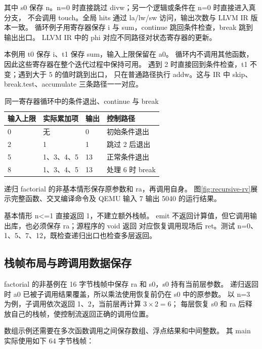其中 s0 保存 n。n=0 时直接跳过 divw；另一个逻辑或条件在 n=0 时直接进入真分支，
不会调用 touch。全局 hits 通过 la/lw/sw 访问，输出次数与 LLVM IR 版本一致。
循环例子用寄存器保存 i 与 sum，continue 跳回条件检查，break 跳到输出出口。
LLVM IR 中的 phi 对应不同路径对状态寄存器的更新。

本例用 t0 保存 i、t1 保存 sum，输入上限保留在 a0。
循环内不调用其他函数，因此这些寄存器在整个迭代过程中保持可用。
遇到 2 时直接回到条件检查，t1 不变；遇到大于 5 的值时跳到出口，
只在普通路径执行 addw。这与 IR 中 skip、break.test、accumulate 三条路径一一对应。

\begin{table}[htbp]
\centering\small
\caption{同一寄存器循环中的条件退出、continue 与 break}
\begin{tabular}{llll}
\toprule
输入上限 & 实际累加项 & 输出 & 控制路径\\
\midrule
0 & 无 & 0 & 初始条件退出\\
2 & 1 & 1 & 跳过 2 后退出\\
5 & 1、3、4、5 & 13 & 正常条件退出\\
8 & 1、3、4、5 & 13 & 处理 6 时 break\\
\bottomrule
\end{tabular}
\end{table}

递归 factorial 的非基本情形保存原参数和 ra，再调用自身。
图\ref{fig:recursive-rv}展示完整函数、交叉编译命令及 QEMU 输入 7 输出 5040 的运行结果。




基本情形 n<=1 直接返回 1，不建立额外栈帧。
emit 不返回计算值，但它调用输出库，也必须保存 ra；源程序的 void 返回
对应恢复调用现场后 ret。测试 n=0、1、5、7、12，既检查递归出口也检查多层返回。

\subsection{栈帧布局与跨调用数据保存}
factorial 的非基例在 16 字节栈帧中保存 ra 和 s0，s0 持有当前层参数。
递归返回时 a0 已被子调用结果覆盖，所以乘法使用恢复前仍在 s0 中的原参数。
以 n=3 为例，子调用依次返回 1、2，当前层再计算 $3\times2=6$；
每层恢复 s0 和 ra 后释放自己的栈帧，使控制流返回正确的调用位置。

数组示例还需要在多次函数调用之间保存数组、浮点结果和中间整数。
其 main 实际使用如下 64 字节栈帧：

